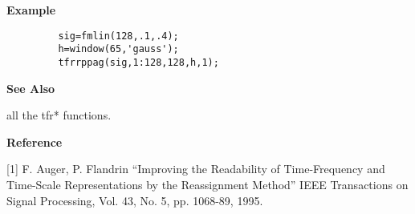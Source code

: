 
{\bf \large {}\selectfont Example}
\begin{verbatim}
         sig=fmlin(128,.1,.4);
         h=window(65,'gauss'); 
         tfrrppag(sig,1:128,128,h,1);
\end{verbatim}
\vspace*{.5cm}


{\bf \large {}\selectfont See Also}\\
\hspace*{1.5cm}
\begin{minipage}[t]{13.5cm}
all the {\ty tfr*} functions.
\end{minipage}
\vspace*{.5cm}


{\bf \large {}\selectfont Reference}\\
\hspace*{1.5cm}
\begin{minipage}[t]{13.5cm}
[1] F. Auger, P. Flandrin ``Improving the Readability of Time-Frequency and
Time-Scale Representations by the Reassignment Method'' IEEE Transactions
on Signal Processing, Vol. 43, No. 5, pp. 1068-89, 1995.
\end{minipage}

